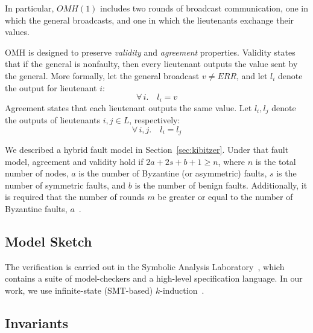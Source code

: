 \documentclass{llncs/llncs}
\newcommand{\lee}[1]{ } %
\newcommand{\lee}[1]{ {\color{blue}$<$lee: #1$>$} } %
\begin{document}
\noindent
In particular, $OMH(1)$ includes two rounds of broadcast communication, one in which the general broadcasts, and one in which the lieutenants exchange their values.

OMH is designed to preserve \emph{validity} and \emph{agreement}
properties. Validity states that if the general is nonfaulty, then every lieutenant outputs the value sent by the general. More formally, let the general broadcast $v \neq ERR$, and let $l_i$ denote the output for lieutenant $i$:
%
\begin{equation}
  \tag{Validity}
    \forall \,i. \quad l_i = v
\end{equation}
%
Agreement states that each lieutenant outputs the same value. Let $l_i, l_j$ denote the outputs of lieutenants $i, j \in L$, respectively:
%
\begin{equation}
  \tag{Agreement}
    \forall \,i, j. \quad l_i = l_j
\end{equation}
%

We described a hybrid fault model in Section~\ref{sec:kibitzer}. Under that fault model, agreement and validity hold if $2a+2s+b+1 \geq n$, where $n$ is the total number of nodes, $a$ is the number of Byzantine (or asymmetric) faults, $s$ is the number of symmetric faults, and $b$ is the number of benign faults. Additionally, it is required that the number of rounds $m$ be greater or equal to the number of Byzantine faults, $a$~\cite{csl-93-2,hybrid}.

\subsection{Model Sketch}
The verification is carried out in the Symbolic Analysis Laboratory~\cite{}, which contains a suite of model-checkers and a high-level specification language. In our work, we use infinite-state (SMT-based) $k$-induction~\cite{}.

\lee{Maybe talk about MJRTY here. Maybe also talk about relaxing in synchronous communication in model.}
\lee{talk about synchrony being loosened, so the general/receivers don't all send/receive at the same time. Talk about lieutenants being ``unrolled'' into relays and receivers, following Rushby.}

\subsection{Invariants}\label{sec:invariants}

\end{document}
